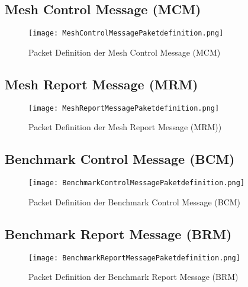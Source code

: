 \subsection{Mesh Control Message (MCM)}\label{subsec:MeshControlMessage}



\begin{figure}[H]
	\centering
	\texttt{[image: MeshControlMessagePaketdefinition.png]}
	\caption{Packet Definition der Mesh Control Message (MCM)}\label{fig:MeshTestKonzept}
\end{figure}

\subsection{Mesh Report Message (MRM)}\label{subsec:MeshReportMessage}



\begin{figure}[H]
	\centering
	\texttt{[image: MeshReportMessagePaketdefinition.png]}
	\caption{Packet Definition der Mesh Report Message (MRM))}\label{fig:MeshTestKonzept}
\end{figure}

\subsection{Benchmark Control Message (BCM)}\label{subsec:BenchmarkControlMessage}


\begin{figure}[H]
	\centering
	\texttt{[image: BenchmarkControlMessagePaketdefinition.png]}
	\caption{Packet Definition der Benchmark Control Message (BCM)}\label{fig:MeshTestKonzept}
\end{figure}

\subsection{Benchmark Report Message (BRM)}\label{subsec:BenchmarkReportMessage}


\begin{figure}[H]
	\centering
	\texttt{[image: BenchmarkReportMessagePaketdefinition.png]}
	\caption{Packet Definition der Benchmark Report Message (BRM)}\label{fig:MeshTestKonzept}
\end{figure}


